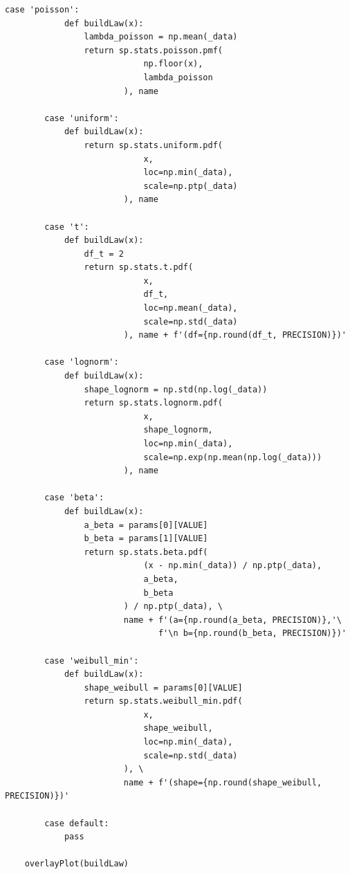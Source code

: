 \documentclass[a4paper, 14pt]{extarticle}
\begin{document}
\begin{lstlisting}[caption={Анализ и вывод полученных данных в ходе теста Колмогорова-Смирнова}, label={lst:11}]
        case 'poisson': 
            def buildLaw(x):
                lambda_poisson = np.mean(_data) 
                return sp.stats.poisson.pmf(
                            np.floor(x), 
                            lambda_poisson
                        ), name
            
        case 'uniform': 
            def buildLaw(x):
                return sp.stats.uniform.pdf(
                            x, 
                            loc=np.min(_data), 
                            scale=np.ptp(_data)
                        ), name

        case 't': 
            def buildLaw(x):
                df_t = 2
                return sp.stats.t.pdf(
                            x, 
                            df_t, 
                            loc=np.mean(_data), 
                            scale=np.std(_data)
                        ), name + f'(df={np.round(df_t, PRECISION)})'

        case 'lognorm': 
            def buildLaw(x):
                shape_lognorm = np.std(np.log(_data))
                return sp.stats.lognorm.pdf(
                            x, 
                            shape_lognorm, 
                            loc=np.min(_data), 
                            scale=np.exp(np.mean(np.log(_data)))
                        ), name

        case 'beta':  
            def buildLaw(x):
                a_beta = params[0][VALUE]
                b_beta = params[1][VALUE]
                return sp.stats.beta.pdf(
                            (x - np.min(_data)) / np.ptp(_data), 
                            a_beta, 
                            b_beta
                        ) / np.ptp(_data), \
                        name + f'(a={np.round(a_beta, PRECISION)},'\
                               f'\n b={np.round(b_beta, PRECISION)})'
            
        case 'weibull_min': 
            def buildLaw(x):
                shape_weibull = params[0][VALUE]
                return sp.stats.weibull_min.pdf(
                            x, 
                            shape_weibull, 
                            loc=np.min(_data), 
                            scale=np.std(_data)
                        ), \
                        name + f'(shape={np.round(shape_weibull, PRECISION)})'
            
        case default:
            pass

    overlayPlot(buildLaw)
\end{lstlisting}
\end{document}
